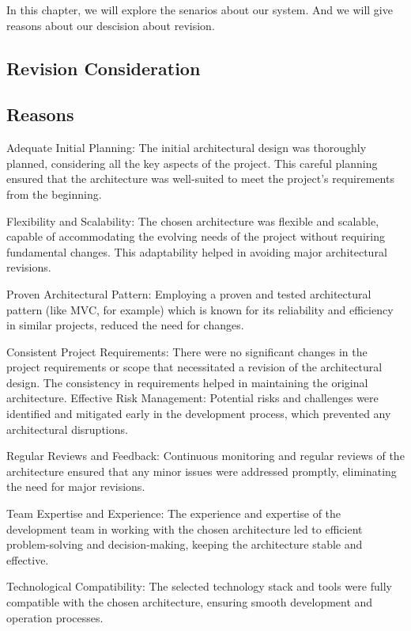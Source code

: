\documentclass[conference]{IEEEtran}
\begin{document}
In this chapter, we will explore the senarios about our system. And we will give reasons about our descision about revision.

\subsection{\textbf{Revision Consideration}}




\subsection{\textbf{Reasons}}

Adequate Initial Planning: The initial architectural design was thoroughly planned, considering all the key aspects of the project. This careful planning ensured that the architecture was well-suited to meet the project's requirements from the beginning.

Flexibility and Scalability: The chosen architecture was flexible and scalable, capable of accommodating the evolving needs of the project without requiring fundamental changes. This adaptability helped in avoiding major architectural revisions.

Proven Architectural Pattern: Employing a proven and tested architectural pattern (like MVC, for example) which is known for its reliability and efficiency in similar projects, reduced the need for changes.

Consistent Project Requirements: There were no significant changes in the project requirements or scope that necessitated a revision of the architectural design. The consistency in requirements helped in maintaining the original architecture.
Effective Risk Management: Potential risks and challenges were identified and mitigated early in the development process, which prevented any architectural disruptions.

Regular Reviews and Feedback: Continuous monitoring and regular reviews of the architecture ensured that any minor issues were addressed promptly, eliminating the need for major revisions.

Team Expertise and Experience: The experience and expertise of the development team in working with the chosen architecture led to efficient problem-solving and decision-making, keeping the architecture stable and effective.

Technological Compatibility: The selected technology stack and tools were fully compatible with the chosen architecture, ensuring smooth development and operation processes.
\end{document}
